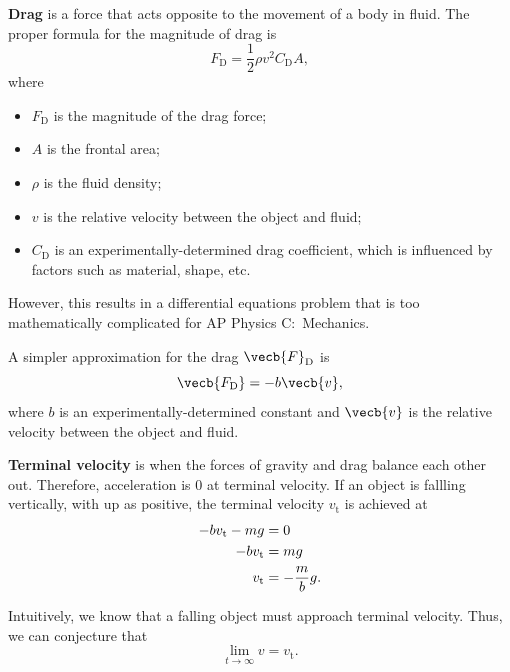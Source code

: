 \textbf{Drag} is a force that acts opposite to the movement of a body in fluid.
The proper formula for the magnitude of drag is
\begin{equation}
    F_\mathrm{D} = \frac{1}{2} \rho v^2 C_\mathrm{D} A,
\end{equation}
where
\begin{itemize}
    \item \(F_\mathrm{D}\) is the magnitude of the drag force;
    \item \(A\) is the frontal area;
    \item \(\rho\) is the fluid density;
    \item \(v\) is the relative velocity between the object and fluid;
    \item \(C_\mathrm{D}\) is an experimentally-determined drag coefficient,
        which is influenced by factors such as material, shape, etc.
\end{itemize}
However, this results in a differential equations problem
that is too mathematically complicated for AP Physics C:~Mechanics.

A simpler approximation for the drag \(\vecb{F}_\mathrm{D}\) is
\begin{equation} \label{eq:linear-drag}
    \vecb{F_\mathrm{D}} = - b \vecb{v},
\end{equation}
where \(b\) is an experimentally-determined constant
and \(\vecb{v}\) is the relative velocity between the object and fluid.

\textbf{Terminal velocity} is when the forces of gravity and drag
balance each other out.
Therefore, acceleration is 0 at terminal velocity.
If an object is fallling vertically, with up as positive,
the terminal velocity \(v_\mathrm{t}\) is achieved at
\begin{equation} \label{eq:linear-terminal-velocity}
    \begin{aligned}
        - b v_\mathrm{t} - m g &= 0 \\
        - b v_\mathrm{t} &= m g \\
        v_\mathrm{t} &= - \frac{m}{b} g. \\
    \end{aligned} \\
\end{equation}

Intuitively, we know that a falling object must approach terminal velocity.
Thus, we can conjecture that
\begin{equation} \label{eq:terminal-velocity-limit}
    \lim_{t \to \infty} v = v_\mathrm{t}.
\end{equation}

